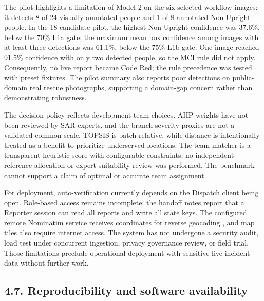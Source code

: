 \documentclass[pdflatex,sn-mathphys-ay]{sn-jnl}
\begin{document}
The pilot highlights a limitation of Model 2 on the six selected workflow images: it detects 8 of 24 visually annotated people and 1 of 8 annotated Non-Upright people. In the 18-candidate pilot, the highest Non-Upright confidence was 37.6\%, below the 70\% L1a gate; the maximum mean box confidence among images with at least three detections was 61.1\%, below the 75\% L1b gate. One image reached 91.5\% confidence with only two detected people, so the MCI rule did not apply. Consequently, no live report became Code Red; the rule precedence was tested with preset fixtures. The pilot summary also reports poor detections on public-domain real rescue photographs, supporting a domain-gap concern rather than demonstrating robustness.

The decision policy reflects development-team choices. AHP weights have not been reviewed by SAR experts, and the branch severity proxies are not a validated common scale. TOPSIS is batch-relative, while distance is intentionally treated as a benefit to prioritize underserved locations. The team matcher is a transparent heuristic score with configurable constraints; no independent reference allocation or expert suitability review was performed. The benchmark cannot support a claim of optimal or accurate team assignment.

For deployment, auto-verification currently depends on the Dispatch client being open. Role-based access remains incomplete: the handoff notes report that a Reporter session can read all reports and write all state keys. The configured remote Nominatim service receives coordinates for reverse geocoding \cite{ref26}, and map tiles also require internet access. The system has not undergone a security audit, load test under concurrent ingestion, privacy governance review, or field trial. Those limitations preclude operational deployment with sensitive live incident data without further work.

\subsection*{4.7. Reproducibility and software availability}
\end{document}

